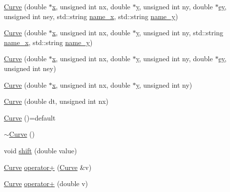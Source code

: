 \begin{DoxyCompactItemize}
\item 
\hyperlink{class_curve_a627534496c4472dedcb5c8bd67f579d0}{Curve} (double $\ast$\hyperlink{class_curve_ae97afae63534c34353e3fc6f5e9d7a8d}{x}, unsigned int nx, double $\ast$\hyperlink{class_curve_a81ad07dc5dccb7a05870b6341ae78364}{y}, unsigned int ny, double $\ast$\hyperlink{class_curve_a76092a26c2894325fda94d4f64326b52}{ey}, unsigned int ney, std\+::string \hyperlink{class_curve_a5ac159e573a921630bed5093ac3ceae5}{name\+\_\+x}, std\+::string \hyperlink{class_curve_aecd575bb016b03dd2c1777153f72931a}{name\+\_\+y})
\item 
\hyperlink{class_curve_a25dc8db43ed446103e71652dd37f4822}{Curve} (double $\ast$\hyperlink{class_curve_ae97afae63534c34353e3fc6f5e9d7a8d}{x}, unsigned int nx, double $\ast$\hyperlink{class_curve_a81ad07dc5dccb7a05870b6341ae78364}{y}, unsigned int ny, std\+::string \hyperlink{class_curve_a5ac159e573a921630bed5093ac3ceae5}{name\+\_\+x}, std\+::string \hyperlink{class_curve_aecd575bb016b03dd2c1777153f72931a}{name\+\_\+y})
\item 
\hyperlink{class_curve_aff266ab3a4e4d4b40555692e67c3a914}{Curve} (double $\ast$\hyperlink{class_curve_ae97afae63534c34353e3fc6f5e9d7a8d}{x}, unsigned int nx, double $\ast$\hyperlink{class_curve_a81ad07dc5dccb7a05870b6341ae78364}{y}, unsigned int ny, double $\ast$\hyperlink{class_curve_a76092a26c2894325fda94d4f64326b52}{ey}, unsigned int ney)
\item 
\hyperlink{class_curve_a56ee024f888ced5ca73b38bde3fbc7aa}{Curve} (double $\ast$\hyperlink{class_curve_ae97afae63534c34353e3fc6f5e9d7a8d}{x}, unsigned int nx, double $\ast$\hyperlink{class_curve_a81ad07dc5dccb7a05870b6341ae78364}{y}, unsigned int ny)
\item 
\hyperlink{class_curve_a5447f926f128f5eca036a89d1b1d4e3f}{Curve} (double dt, unsigned int nx)
\item 
\hyperlink{class_curve_a09c87588b0ceab57603fb6e193875b20}{Curve} ()=default
\item 
\hyperlink{class_curve_a7ce6ff79064e9795241423ed47166539}{$\sim$\+Curve} ()
\item 
void \hyperlink{class_curve_aaefb5086df5ad824628b9aaef7f27714}{shift} (double value)
\item 
\hyperlink{class_curve}{Curve} \hyperlink{class_curve_a015ca17f63cc971bb7c2885b2d2de2df}{operator+} (\hyperlink{class_curve}{Curve} \&v)
\item 
\hyperlink{class_curve}{Curve} \hyperlink{class_curve_a03352202f80edde95e6581485ee78e1c}{operator+} (double v)
\item 

\end{DoxyCompactItemize}
